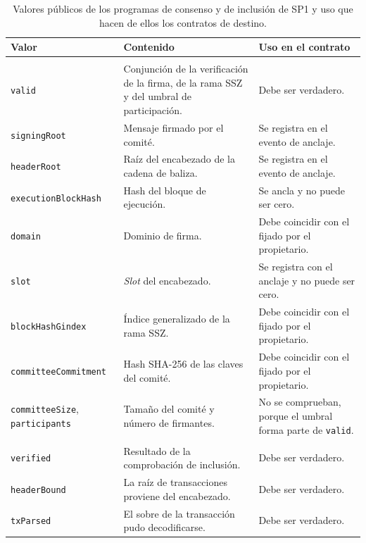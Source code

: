 \begin{table}[h!]
	\centering
	\caption{Valores públicos de los programas de consenso y de inclusión de SP1 y uso que hacen de
	ellos los contratos de destino.}
	\label{tab:valores_publicos}
	\footnotesize
	\begin{tabular}{>{\raggedright\arraybackslash}p{3.6cm} >{\raggedright\arraybackslash}p{5.9cm}
		>{\raggedright\arraybackslash}p{6.0cm}}
		\toprule
		\textbf{Valor} & \textbf{Contenido} & \textbf{Uso en el contrato} \\
		\midrule
		\multicolumn{3}{l}{\textit{Programa de consenso, consumido por} \texttt{BeaconLightClient}} \\
		\addlinespace
		\texttt{valid} & Conjunción de la verificación de la firma, de la rama SSZ y del umbral de
		participación. & Debe ser verdadero. \\
		\texttt{signingRoot} & Mensaje firmado por el comité. & Se registra en el evento de anclaje. \\
		\texttt{headerRoot} & Raíz del encabezado de la cadena de baliza. & Se registra en el evento
		de anclaje. \\
		\texttt{executionBlockHash} & Hash del bloque de ejecución. & Se ancla y no puede ser cero. \\
		\texttt{domain} & Dominio de firma. & Debe coincidir con el fijado por el propietario. \\
		\texttt{slot} & \textit{Slot} del encabezado. & Se registra con el anclaje y no puede ser
		cero. \\
		\texttt{blockHashGindex} & Índice generalizado de la rama SSZ. & Debe coincidir con el fijado
		por el propietario. \\
		\texttt{committeeCommitment} & Hash SHA-256 de las claves del comité. & Debe coincidir con el
		fijado por el propietario. \\
		\texttt{committeeSize}, \texttt{participants} & Tamaño del comité y número de firmantes. & No
		se comprueban, porque el umbral forma parte de \texttt{valid}. \\
		\midrule
		\multicolumn{3}{l}{\textit{Programa de inclusión, consumido por} \texttt{ZKReceiver}} \\
		\addlinespace
		\texttt{verified} & Resultado de la comprobación de inclusión. & Debe ser verdadero. \\
		\texttt{headerBound} & La raíz de transacciones proviene del encabezado. & Debe ser
		verdadero. \\
		\texttt{txParsed} & El sobre de la transacción pudo decodificarse. & Debe ser verdadero. \\

\end{tabular}
\end{table}

